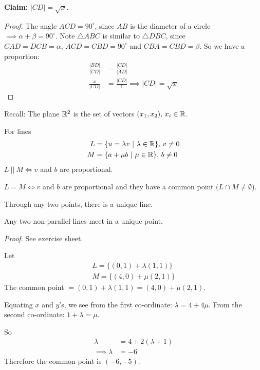 \documentclass[10pt]{scrartcl}
\begin{document}
\textbf{Claim:} $|CD| = \sqrt{x}$. 

\begin{proof}
The angle $ACD  = 90^\circ$, since $AB$ is the diameter of a circle $\implies \alpha + \beta = 90^\circ$. Note $\triangle ABC$ is similar to $\triangle DBC$, since $CAD = DCB = \alpha,\, ACD = CBD = 90^\circ$ and $CBA = CBD = \beta$. So we have a proportion: 
\begin{align*}
  \frac{|BD|}{|CD|} &= \frac{|CD|}{|AD|} \\[0.2cm]
  \frac{x}{|CD|} &= \frac{|CD|}{1} \implies |CD| = \sqrt{x}
\end{align*}
	
\end{proof}

Recall: The plane $\mathbb{R}^2$ is the set of vectors $(x_1,x_2),\,x_i\in\mathbb{R}$. 

For lines  \begin{align*}L &= \{ u = \lambda v ~|~ \lambda \in \mathbb{R}\},\,v \neq 0\\M &= \{a + \mu b ~|~ \mu \in \mathbb{R}\},\,b \neq 0\end{align*}
$L ~||~ M \iff v$ and $b$ are proportional. 

$L = M \iff v$ and $b$ are proportional and they have a common point $(L \cap M \neq \emptyset$).\\

\begin{proposition}
Through any two points, there is a unique line.
\end{proposition}
\begin{proposition}
Any two non-parallel lines meet in a unique point.	
\end{proposition}
\emph{Proof.}
See exercise sheet.\\

\begin{example}
Let \vspace*{-5pt}\begin{align*}
  L = \{(0,1) + \lambda(1,1)\}\\
  M = \{(4,0) + \mu(2,1)\}
\end{align*}
The common point $ = (0,1) + \lambda(1,1) = (4,0) + \mu(2,1)$. 

Equating $x$ and $y$'s, we see from the first co-ordinate: $\lambda = 4 + 4\mu$. From the second co-ordinate: $1 + \lambda = \mu$.

So \vspace*{-5pt}
\begin{align*}
  \lambda &= 4 + 2(\lambda + 1) \\
  \implies \lambda &= -6
\end{align*}
Therefore the common point is $(-6,-5)$. 
\end{example}
\end{document}
